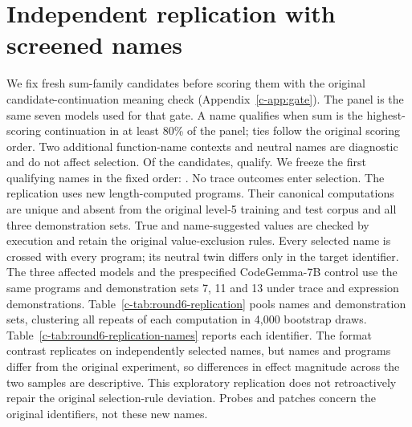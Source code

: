 \section{Independent replication with screened names}
\label{c-app:round6-identifiers}
We fix  fresh sum-family candidates before scoring them with the original candidate-continuation meaning check (Appendix~\ref{c-app:gate}). The panel is the same seven models used for that gate. A name qualifies when sum is the highest-scoring continuation in at least 80\% of the panel; ties follow the original scoring order. Two additional function-name contexts and neutral names are diagnostic and do not affect selection. Of the candidates,  qualify. We freeze the first  qualifying names in the fixed order: . No trace outcomes enter selection.
The replication uses  new length-computed programs. Their canonical computations are unique and absent from the original level-5 training and test corpus and all three demonstration sets. True and name-suggested values are checked by execution and retain the original value-exclusion rules. Every selected name is crossed with every program; its neutral twin differs only in the target identifier. The three affected models and the prespecified CodeGemma-7B control use the same programs and demonstration sets 7, 11 and 13 under trace and expression demonstrations.
Table~\ref{c-tab:round6-replication} pools names and demonstration sets, clustering all repeats of each computation in 4,000 bootstrap draws. Table~\ref{c-tab:round6-replication-names} reports each identifier. The format contrast replicates on independently selected names, but names and programs differ from the original experiment, so differences in effect magnitude across the two samples are descriptive. This exploratory replication does not retroactively repair the original selection-rule deviation. Probes and patches concern the original identifiers, not these new names.
